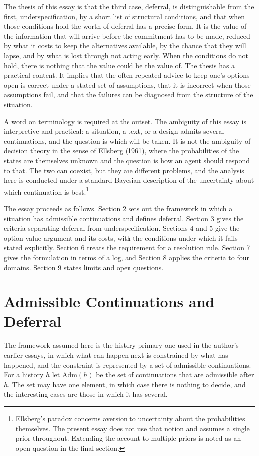 \documentclass[11pt]{article}
\theoremstyle{remark}
\begin{document}
The thesis of this essay is that the third case, deferral, is distinguishable from the first, underspecification, by a short list of structural conditions, and that when those conditions hold the worth of deferral has a precise form. It is the value of the information that will arrive before the commitment has to be made, reduced by what it costs to keep the alternatives available, by the chance that they will lapse, and by what is lost through not acting early. When the conditions do not hold, there is nothing that the value could be the value of. The thesis has a practical content. It implies that the often-repeated advice to keep one's options open is correct under a stated set of assumptions, that it is incorrect when those assumptions fail, and that the failures can be diagnosed from the structure of the situation.

A word on terminology is required at the outset. The ambiguity of this essay is interpretive and practical: a situation, a text, or a design admits several continuations, and the question is which will be taken. It is not the ambiguity of decision theory in the sense of Ellsberg (1961), where the probabilities of the states are themselves unknown and the question is how an agent should respond to that. The two can coexist, but they are different problems, and the analysis here is conducted under a standard Bayesian description of the uncertainty about which continuation is best.\footnote{Ellsberg's paradox concerns aversion to uncertainty about the probabilities themselves. The present essay does not use that notion and assumes a single prior throughout. Extending the account to multiple priors is noted as an open question in the final section.}

The essay proceeds as follows. Section 2 sets out the framework in which a situation has admissible continuations and defines deferral. Section 3 gives the criteria separating deferral from underspecification. Sections 4 and 5 give the option-value argument and its costs, with the conditions under which it fails stated explicitly. Section 6 treats the requirement for a resolution rule. Section 7 gives the formulation in terms of a log, and Section 8 applies the criteria to four domains. Section 9 states limits and open questions.

\section{Admissible Continuations and Deferral}

The framework assumed here is the history-primary one used in the author's earlier essays, in which what can happen next is constrained by what has happened, and the constraint is represented by a set of admissible continuations. For a history $h$ let $\mathrm{Adm}(h)$ be the set of continuations that are admissible after $h$. The set may have one element, in which case there is nothing to decide, and the interesting cases are those in which it has several.
\end{document}
